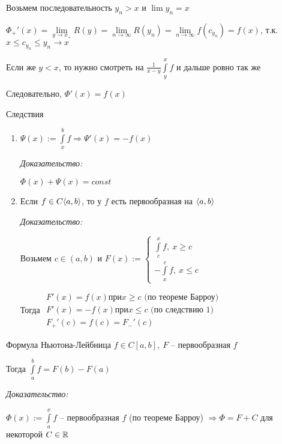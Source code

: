 \documentclass[12pt]{article}
\begin{document}
Возьмем последовательность $y_n > x$ и $\lim y_n = x$

$\Phi_+'(x) = \lim\limits_{y \to x_+} R(y) = \lim\limits_{n \to \infty} R(y_n) = \lim\limits_{n \to \infty} f(c_{y_n}) = f(x)$, т.к. $x \leq c_{y_n} \leq y_n \rightarrow x$

Если же $y < x$, то нужно смотреть на $\frac{1}{x - y} \int\limits_y^x f$ и дальше ровно так же 

Следовательно, $\Phi'(x) = f(x)$

\begin{theo}{Следствия}
    \begin{enumerate}
        \item $\Psi(x) := \int\limits_x^b f \Rightarrow \Psi'(x) = -f(x)$
        
        \textit{Доказательство:}

        $\Phi(x) + \Psi(x) = const$

        \item Если $f \in C\langle a, b \rangle$, то у $f$ есть первообразная на $\langle a, b \rangle$
        
        \textit{Доказательство:}

        Возьмем $c \in (a, b)$ и $F(x) := \begin{cases}
            \int\limits_c^x f,\ x \geq c \\
            -\int\limits_x^c f,\ x \leq c
        \end{cases}$
        
        Тогда $\begin{gathered}
            F'(x) = f(x) \text{при} x \geq c \text{ (по теореме Барроу)} \\
            F'(x) = -f(x) \text{при} x \leq c \text{ (по следствию 1)} \\
            F_+'(c) = f(c) = F_-'(c)
        \end{gathered}$
    \end{enumerate}
\end{theo}

\begin{theo}{Формула Ньютона-Лейбница}
    $f \in C[a, b],\ F$ -- первообразная $f$

    Тогда $\int\limits_a^b f = F(b) - F(a)$
\end{theo}

\textit{Доказательство:}

$\Phi(x) := \int\limits_a^x f$ -- первообразная $f$ (по теореме Барроу) $\Rightarrow \Phi = F + C$ для некоторой $C \in \mathbb R$
\end{document}

